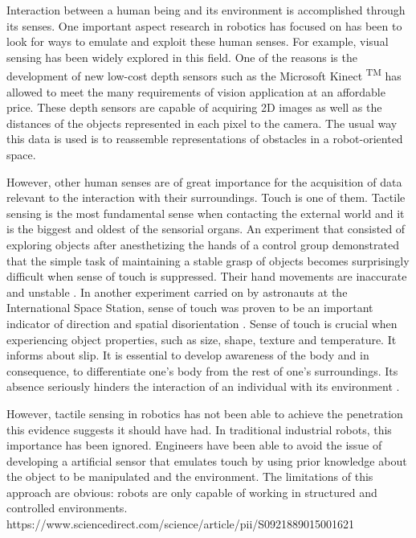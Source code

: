 Interaction between a human being and its environment is accomplished through its senses. One important aspect research in robotics has focused on has been to look for ways to emulate and exploit these human senses. For example, visual sensing has been widely explored in this field. One of the reasons is the development of new low-cost depth sensors such as the Microsoft Kinect \textsuperscript{TM} has allowed to meet the many requirements of vision application at an affordable price. These depth sensors are capable of acquiring 2D images as well as the distances of the objects represented in each pixel to the camera. The usual way this data is used is to reassemble representations of obstacles in a robot-oriented space.

However, other human senses are of great importance for the acquisition of data relevant to the interaction with their surroundings. Touch is one of them. Tactile sensing is the most fundamental sense when contacting the external world and it is the biggest and oldest of the sensorial organs. An experiment that consisted of exploring objects after anesthetizing the hands of a control group demonstrated that the simple task of maintaining a stable grasp of objects becomes surprisingly difficult when sense of touch is suppressed. Their hand movements are inaccurate and unstable \cite{westling1984factors}. In another experiment carried on by astronauts at the International Space Station, sense of touch was proven to be an important indicator of direction and spatial disorientation \cite{van2006touch}. Sense of touch is crucial when experiencing object properties, such as size, shape, texture and temperature. It informs about slip. It is essential to develop awareness of the body and in consequence, to differentiate one’s body from the rest of one’s surroundings. Its absence seriously hinders the interaction of an individual with its environment \cite{dahiya2009tactile}.

However, tactile sensing in robotics has not been able to achieve the penetration this evidence suggests it should have had. In traditional industrial robots, this importance has been ignored. Engineers have been able to avoid the issue of developing a artificial sensor that emulates touch by using prior knowledge about the object to be manipulated and the environment. The limitations of this approach are obvious: robots are only capable of working in structured and controlled environments. https://www.sciencedirect.com/science/article/pii/S0921889015001621

